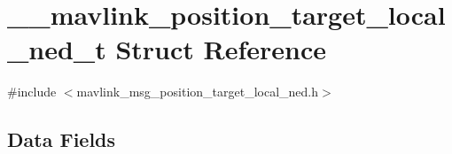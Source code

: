 \hypertarget{struct____mavlink__position__target__local__ned__t}{\section{\+\_\+\+\_\+mavlink\+\_\+position\+\_\+target\+\_\+local\+\_\+ned\+\_\+t Struct Reference}
\label{struct____mavlink__position__target__local__ned__t}
}


{\ttfamily \#include $<$mavlink\+\_\+msg\+\_\+position\+\_\+target\+\_\+local\+\_\+ned.\+h$>$}

\subsection*{Data Fields}
